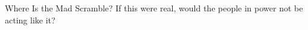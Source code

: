 \begin{frame}{Where Is the Mad Scramble?}
\centering
\vfill
{\Large If this were real, would the people in power not be acting like it?}
\vfill
\end{frame}
